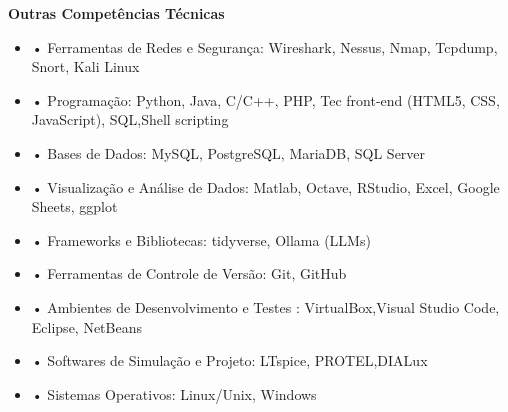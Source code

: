 \documentclass[10pt,a4paper,oneside]{article}
\newlength{\datewidth}
\newlength{\textindent}
\begin{document}
	\textbf{\hspace{\textindent}Outras Competências Técnicas}	\begin{itemize}
			\item[\hspace{\datewidth}] \parbox[t]{\dimexpr\linewidth-\datewidth-\textindent}{•  Ferramentas de Redes e Segurança: Wireshark, Nessus, Nmap, Tcpdump, Snort, Kali Linux}
			\item[\hspace{\datewidth}] \parbox[t]{\dimexpr\linewidth-\datewidth-\textindent}{•  Programação: Python, Java, C/C++, PHP, Tec front-end (HTML5, CSS, JavaScript), SQL,Shell scripting}
			\item[\hspace{\datewidth}] \parbox[t]{\dimexpr\linewidth-\datewidth-\textindent}{•  Bases de Dados: MySQL, PostgreSQL, MariaDB, SQL Server}
			\item[\hspace{\datewidth}] \parbox[t]{\dimexpr\linewidth-\datewidth-\textindent}{•  Visualização e Análise de Dados: Matlab, Octave, RStudio, Excel, Google Sheets, ggplot}
			
			\item[\hspace{\datewidth}] \parbox[t]{\dimexpr\linewidth-\datewidth-\textindent}{•  Frameworks e Bibliotecas: tidyverse, Ollama (LLMs)}	
				
			\item[\hspace{\datewidth}] \parbox[t]{\dimexpr\linewidth-\datewidth-\textindent}{•  Ferramentas de Controle de Versão: Git, GitHub}
			\item[\hspace{\datewidth}] \parbox[t]{\dimexpr\linewidth-\datewidth-\textindent}{•  Ambientes de Desenvolvimento e Testes : VirtualBox,Visual Studio Code, Eclipse, NetBeans}
			\item[\hspace{\datewidth}] \parbox[t]{\dimexpr\linewidth-\datewidth-\textindent}{•  Softwares de Simulação e Projeto: LTspice, PROTEL,DIALux}
			\item[\hspace{\datewidth}] \parbox[t]{\dimexpr\linewidth-\datewidth-\textindent}{•  Sistemas Operativos: Linux/Unix, Windows}
		\end{itemize}
	
\end{document}
